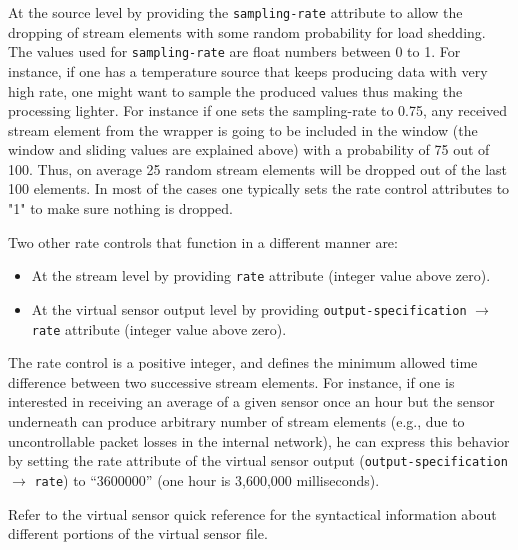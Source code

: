 At the source level by providing the \texttt{sampling-rate} attribute to allow the dropping of stream elements with some random probability for load shedding.
The values used for \texttt{sampling-rate} are float numbers between 0 to 1.
For instance, if one has a temperature source that keeps producing 
data with very high rate, one might want to sample the produced values 
thus making the processing lighter. For instance if one sets the 
sampling-rate to 0.75, any received stream element from the wrapper is going to be 
included in the window (the window and sliding values are explained above) with a probability of 75 out of 100.
Thus, on average 25 random stream elements will be dropped out of the last 100 elements.
In most of the cases one typically sets the rate control attributes to "1" to make sure nothing is dropped.

Two other rate controls that function in a different manner are:
\begin{itemize}
\item At the stream level by providing \texttt{rate} attribute (integer value above zero).
\item At the virtual sensor output level by providing \texttt{output-specification} $\rightarrow$ \texttt{rate} attribute (integer value above zero).
\end{itemize}

The rate control is a positive integer, and defines the minimum allowed time difference between two successive stream elements.
For instance, if one is interested in receiving an average of a given sensor once an hour but the sensor underneath can produce arbitrary number of stream elements 
(e.g., due to uncontrollable packet losses in the internal network), he can express this behavior by setting the rate attribute of the virtual sensor output 
(\texttt{output-specification} $\rightarrow$ \texttt{rate}) to ``3600000'' (one hour is 3,600,000 milliseconds).


Refer to the virtual sensor quick reference for the syntactical
information about different portions of the virtual sensor file.


